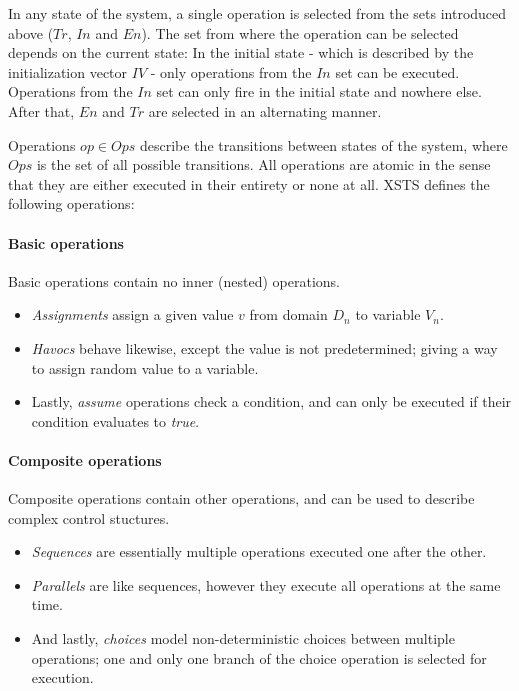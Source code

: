 In any state of the system, a single operation is selected from the sets introduced above (\(Tr\), \(In\) and \(En\)). The set from where the operation can be selected depends on the current state: In the initial state - which is described by the initialization vector \(IV\) - only operations from the \(In\) set can be executed. Operations from the \(In\) set can only fire in the initial state and nowhere else. After that, \(En\) and \(Tr\) are selected in an alternating manner.

Operations \(op \in Ops\) describe the transitions between states of the system, where \(Ops\) is the set of all possible transitions. All operations are atomic in the sense that they are either executed in their entirety or none at all. XSTS defines the following operations:

\paragraph{Basic operations} 

Basic operations contain no inner (nested) operations.

\begin{itemize}
	\item \emph{Assignments} assign a given value \(v\) from domain \(D_n\) to variable \(V_n\).
	\item \emph{Havocs} behave likewise, except the value is not predetermined; giving a way to assign random value to a variable.
	\item Lastly, \emph{assume} operations check a condition, and can only be executed if their condition evaluates to \emph{true}.
\end{itemize}

\paragraph{Composite operations}

Composite operations contain other operations, and can be used to describe complex control stuctures. 

\begin{itemize}
	\item \emph{Sequences} are essentially multiple operations executed one after the other.
	\item \emph{Parallels} are like sequences, however they execute all operations at the same time.
	\item And lastly, \emph{choices} model non-deterministic choices between multiple operations; one and only one branch of the choice operation is selected for execution.
\end{itemize}

